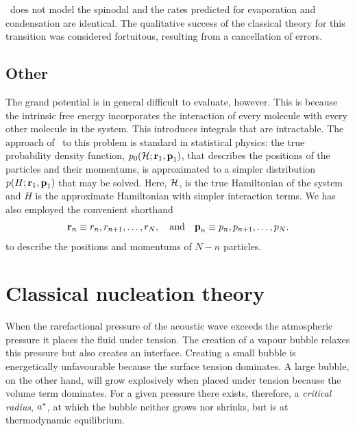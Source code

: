 \Cnt\ does not model the spinodal and the rates predicted for   evaporation and condensation are identical.
The qualitative success of the classical theory for this transition was considered fortuitous,
resulting from a cancellation of errors\cite{Oxtoby1997}.



\subsection{Other}


The grand potential is in general difficult to evaluate, however.
This is because the intrinsic free energy incorporates the interaction of every molecule with every other molecule in the system.
This introduces integrals that are intractable.
The approach of \dft\ to this problem is standard in statistical physics:
the true probability density function, $p_0({\cal H}; {\mathbf{\textbf{r}}}_1,{\mathbf{\textbf{p}}}_1)$, that describes 
the positions of the particles and their momentums,
is approximated to a simpler distribution $p(H; {\mathbf{\textbf{r}}}_1, {\mathbf{\textbf{p}}}_1)$ that may be solved.
Here, ${\cal H}$, is the true Hamiltonian of the system 
and $H$ is the approximate Hamiltonian with simpler interaction terms.
We has also employed the  convenient shorthand
\begin{align}
{\mathbf{\textbf{r}}}_n \equiv r_n,r_{n+1},\ldots,r_N,  \quad\text{and}\quad
{\mathbf{\textbf{p}}}_n \equiv  p_n,p_{n+1},\ldots, p_N.
    \label{eqn:shorthand}
\end{align}
to describe the positions and momentums of  $N-n$ particles.



\section{Classical nucleation theory} \label{sec:nuc:CNT}


When the rarefactional pressure of the acoustic wave exceeds the atmospheric pressure it places the fluid under tension.
The creation of a vapour bubble  relaxes this pressure but  also creates an interface.
Creating a small bubble is energetically unfavourable because the surface tension dominates.
A large bubble, on the other hand, will grow explosively when placed under tension because the volume term dominates.
For a given pressure there exists, therefore, a {\em critical radius}, ${a^\ast}$, at which the bubble neither grows nor shrinks, 
but is at thermodynamic equilibrium.

